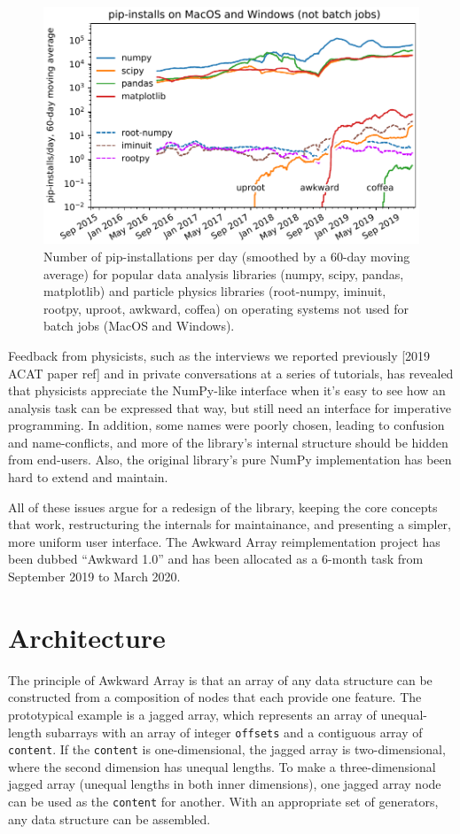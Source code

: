 \documentclass{webofc}
\begin{document}
\begin{figure}
\begin{center}
\includegraphics[width=0.7\linewidth]{pip-timeline.pdf}
\end{center}
\caption{Number of pip-installations per day (smoothed by a 60-day moving average) for popular data analysis libraries (numpy, scipy, pandas, matplotlib) and particle physics libraries (root-numpy, iminuit, rootpy, uproot, awkward, coffea) on operating systems not used for batch jobs (MacOS and Windows). \label{fig:pip-timeline}}
\end{figure}

Feedback from physicists, such as the interviews we reported previously [2019 ACAT paper ref] and in private conversations at a series of tutorials, has revealed that physicists appreciate the NumPy-like interface when it's easy to see how an analysis task can be expressed that way, but still need an interface for imperative programming. In addition, some names were poorly chosen, leading to confusion and name-conflicts, and more of the library's internal structure should be hidden from end-users. Also, the original library's pure NumPy implementation has been hard to extend and maintain.

All of these issues argue for a redesign of the library, keeping the core concepts that work, restructuring the internals for maintainance, and presenting a simpler, more uniform user interface. The Awkward Array reimplementation project has been dubbed ``Awkward 1.0'' and has been allocated as a 6-month task from September 2019 to March 2020.

\section{Architecture}

The principle of Awkward Array is that an array of any data structure can be constructed from a composition of nodes that each provide one feature. The prototypical example is a jagged array, which represents an array of unequal-length subarrays with an array of integer \texttt{offsets} and a contiguous array of \texttt{content}. If the \texttt{content} is one-dimensional, the jagged array is two-dimensional, where the second dimension has unequal lengths. To make a three-dimensional jagged array (unequal lengths in both inner dimensions), one jagged array node can be used as the \texttt{content} for another. With an appropriate set of generators, any data structure can be assembled.
\end{document}
